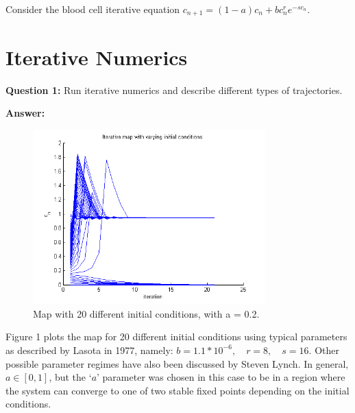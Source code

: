 \pagebreak{}

Consider the blood cell iterative equation $c_{n+1} = (1-a)c_{n}+bc_{n}^{r}e^{-sc_{n}}$.

\section*{Iterative Numerics}
\textbf{Question 1:} Run iterative numerics and describe different types of trajectories.

\textbf{Answer:} 
\begin{figure}[H]
	\begin{center}
    \includegraphics[width=0.8\textwidth]{IterativeNumerics}
    \end{center}
    \caption{Map with 20 different initial conditions, with a = 0.2.}
    \label{Fig. 1}
\end{figure}
Figure 1 plots the map for 20 different initial conditions using typical parameters as described by Lasota in 1977, namely: $b=1.1*10^{-6}, \quad r=8, \quad s=16$. Other possible parameter regimes have also been discussed by Steven Lynch. In general, $a \in [0,1]$, but the `$a$' parameter was chosen in this case to be in a region where the system can converge to one of two stable fixed points depending on the initial conditions. 

